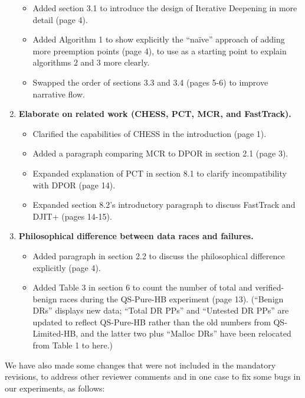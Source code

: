 \documentclass{article}
\begin{document}
\begin{enumerate}
	\begin{itemize}
		\item Added section 3.1 to introduce the design of Iterative Deepening in more detail (page 4).
		\item Added Algorithm 1 to show explicitly the ``na\"ive'' approach of adding more preemption points (page 4), to use as a starting point to explain algorithms 2 and 3 more clearly.
		\item Swapped the order of sections 3.3 and 3.4 (pages 5-6) to improve narrative flow.
	\end{itemize}
	\item {\bf Elaborate on related work (CHESS, PCT, MCR, and FastTrack).}
	\begin{itemize}
		\item Clarified the capabilities of CHESS in the introduction (page 1).
		\item Added a paragraph comparing MCR to DPOR in section 2.1 (page 3).
		\item Expanded explanation of PCT in section 8.1 to clarify incompatibility with DPOR (page 14).
		\item Expanded section 8.2's introductory paragraph to discuss FastTrack and DJIT+ (pages 14-15).
	\end{itemize}
	\item {\bf Philosophical difference between data races and failures.}
	\begin{itemize}
		\item Added paragraph in section 2.2 to discuss the philosophical difference explicitly (page 4).
		\item Added Table 3 in section 6 to count the number of total and verified-benign races during the QS-Pure-HB experiment (page 13). (``Benign DRs'' displays new data; ``Total DR PPs'' and ``Untested DR PPs'' are updated to reflect QS-Pure-HB rather than the old numbers from QS-Limited-HB, and the latter two plus ``Malloc DRs'' have been relocated from Table 1 to here.)
	\end{itemize}
\end{enumerate}

We have also made some changes that were not included in the mandatory revisions, to address other reviewer comments and in one case to fix some bugs in our experiments, as follows:
\end{document}
